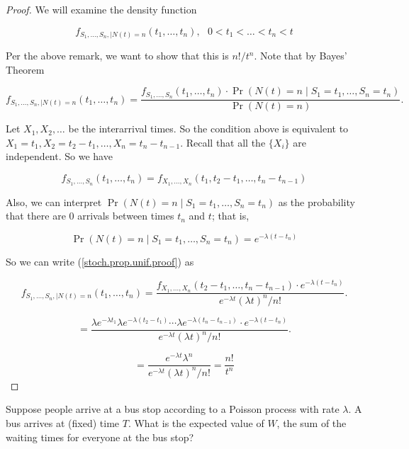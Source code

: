 \begin{proof} We will examine the density function

\[
f_{S_1, \ldots, S_n, \mid N(t) =n}(t_1, \ldots, t_n), \ \ \ 0 < t_1 < \ldots < t_n < t
\]

Per the above remark, we want to show that this is \(n!/t^n\). Note that by Bayes' Theorem

\begin{equation}\label{stoch.prop.unif.proof}
f_{S_1, \ldots, S_n, \mid N(t) =n}(t_1, \ldots, t_n) = \frac{f_{S_1, \ldots, S_n}(t_1, \ldots, t_n) \cdot \Pr(N(t) = n \mid S_1 = t_1, \ldots, S_n = t_n  )}{\Pr(N(t) = n)}.
\end{equation}

Let \(X_1, X_2, \ldots\) be the interarrival times. So the condition above is equivalent to \(X_1 = t_1, X_2 = t_2 - t_1, \ldots, X_n = t_n - t_{n-1}\). Recall that all the \(\{X_i\}\) are independent. So we have

\[
f_{S_1, \ldots, S_n}(t_1, \ldots, t_n) = f_{X_1, \ldots, X_n}(t_1, t_2 - t_1, \ldots, t_n - t_{n-1})
\]

Also, we can interpret \(\Pr(N(t) = n \mid S_1 = t_1, \ldots, S_n = t_n  )\) as the probability that there are 0 arrivals between times \(t_n\) and \(t\); that is,

\[
\Pr(N(t) = n \mid S_1 = t_1, \ldots, S_n = t_n  ) = e^{-\lambda(t-t_n)}
\]

So we can write (\ref{stoch.prop.unif.proof}) as 

\[
f_{S_1, \ldots, S_n, \mid N(t) =n}(t_1, \ldots, t_n) = \frac{  f_{X_1, \ldots, X_n}(t_2 - t_1, \ldots, t_n - t_{n-1}) \cdot e^{-\lambda(t-t_n)} }{e^{-\lambda t} (\lambda t)^n/n!}.
\]

\[
= \frac{ \lambda e^{-\lambda t_1} \lambda e^{- \lambda(t_2 - t_1) } \cdots \lambda e^{-\lambda(t_n - t_{n-1})} \cdot e^{-\lambda(t-t_n)} }{e^{-\lambda t} (\lambda t)^n/n!}.
\]

\[
= \frac{ e^{-\lambda t} \lambda^n }{e^{-\lambda t} (\lambda t)^n/n!} = \frac{n!}{t^n}
\]

\end{proof}

\begin{example}\label{stoch.bus.total.wait.order.poisson} Suppose people arrive at a bus stop according to a Poisson process with rate \(\lambda\). A bus arrives at (fixed) time \(T\). What is the expected value of \(W\), the sum of the waiting times for everyone at the bus stop?

\end{example}

